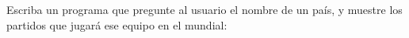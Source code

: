 Escriba un programa que pregunte al usuario el nombre de un país,
y muestre los partidos que jugará ese equipo en el mundial:

\begin{minipage}[t]{\textwidth}
  
\end{minipage}


